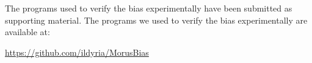 \ifanonymous
The programs used to verify the bias experimentally have been
submitted as supporting material.
\else
The programs we used to verify the bias experimentally are available at:\\
\centerline{
\url{https://github.com/ildyria/MorusBias}
}
\fi

%


